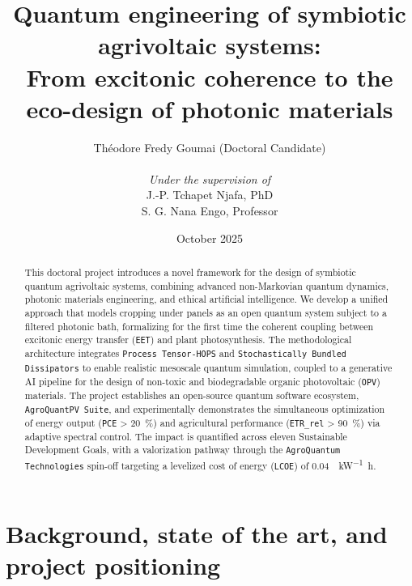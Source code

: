 \documentclass[12pt, a4paper]{article}
\begin{document}
\title{\huge Quantum engineering of symbiotic agrivoltaic systems:\\ From excitonic coherence to the eco-design of photonic materials}
\author{
    Théodore Fredy Goumai (Doctoral Candidate) \\
    \\
    \textit{Under the supervision of} \\
    J.-P. Tchapet Njafa, PhD \\
    S. G. Nana Engo, Professor
}
\date{October 2025}

\maketitle
\thispagestyle{empty}
\newpage

\begin{abstract}
This doctoral project introduces a novel framework for the design of symbiotic quantum agrivoltaic systems, combining advanced non-Markovian quantum dynamics, photonic materials engineering, and ethical artificial intelligence. We develop a unified approach that models cropping under panels as an open quantum system subject to a filtered photonic bath, formalizing for the first time the coherent coupling between excitonic energy transfer (\texttt{EET}) and plant photosynthesis. The methodological architecture integrates \texttt{Process Tensor-HOPS} and \texttt{Stochastically Bundled Dissipators} to enable realistic mesoscale quantum simulation, coupled to a generative AI pipeline for the design of non-toxic and biodegradable organic photovoltaic (\texttt{OPV}) materials. The project establishes an open-source quantum software ecosystem, \texttt{AgroQuantPV Suite}, and experimentally demonstrates the simultaneous optimization of energy output (\texttt{PCE} > \SI{20}{\percent}) and agricultural performance (\texttt{ETR\_{rel}} > \SI{90}{\percent}) via adaptive spectral control. The impact is quantified across eleven Sustainable Development Goals, with a valorization pathway through the \texttt{AgroQuantum Technologies} spin-off targeting a levelized cost of energy (\texttt{LCOE}) of \SI{0.04}{\dollar\per\kilo\watt\hour}.
\end{abstract}
\newpage

\tableofcontents
\newpage
\setcounter{page}{1}

\section{Background, state of the art, and project positioning}
\end{document}
